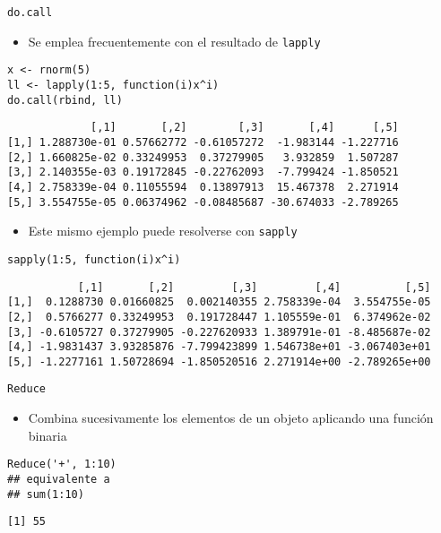 \documentclass[xcolor={usenames,svgnames,dvipsnames}]{beamer}
\begin{document}
\begin{frame}[fragile,label=sec-4-2]{\texttt{do.call}}
 \begin{itemize}
\item Se emplea frecuentemente con el resultado de \texttt{lapply}
\end{itemize}
\lstset{language=R,numbers=none}
\begin{lstlisting}
x <- rnorm(5)
ll <- lapply(1:5, function(i)x^i)
do.call(rbind, ll)
\end{lstlisting}

\begin{verbatim}
             [,1]       [,2]        [,3]       [,4]      [,5]
[1,] 1.288730e-01 0.57662772 -0.61057272  -1.983144 -1.227716
[2,] 1.660825e-02 0.33249953  0.37279905   3.932859  1.507287
[3,] 2.140355e-03 0.19172845 -0.22762093  -7.799424 -1.850521
[4,] 2.758339e-04 0.11055594  0.13897913  15.467378  2.271914
[5,] 3.554755e-05 0.06374962 -0.08485687 -30.674033 -2.789265
\end{verbatim}

\begin{itemize}
\item Este mismo ejemplo puede resolverse con \texttt{sapply}
\end{itemize}
\lstset{language=R,numbers=none}
\begin{lstlisting}
sapply(1:5, function(i)x^i)
\end{lstlisting}

\begin{verbatim}
           [,1]       [,2]         [,3]         [,4]          [,5]
[1,]  0.1288730 0.01660825  0.002140355 2.758339e-04  3.554755e-05
[2,]  0.5766277 0.33249953  0.191728447 1.105559e-01  6.374962e-02
[3,] -0.6105727 0.37279905 -0.227620933 1.389791e-01 -8.485687e-02
[4,] -1.9831437 3.93285876 -7.799423899 1.546738e+01 -3.067403e+01
[5,] -1.2277161 1.50728694 -1.850520516 2.271914e+00 -2.789265e+00
\end{verbatim}
\end{frame}
\begin{frame}[fragile,label=sec-4-3]{\texttt{Reduce}}
 \begin{itemize}
\item Combina sucesivamente los elementos de un objeto aplicando una
función binaria
\end{itemize}
\lstset{language=R,numbers=none}
\begin{lstlisting}
Reduce('+', 1:10)
## equivalente a 
## sum(1:10)
\end{lstlisting}

\begin{verbatim}
[1] 55
\end{verbatim}
\end{frame}
\end{document}
